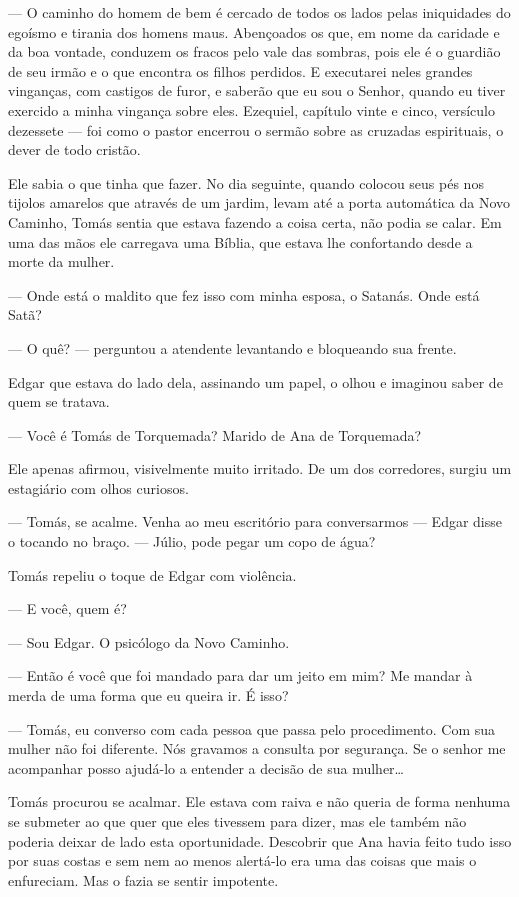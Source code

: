 --- O caminho do homem de bem é cercado de todos os lados pelas iniquidades do egoísmo e tirania dos homens maus. Abençoados os que, em nome da caridade e da boa vontade, conduzem os fracos pelo vale das sombras, pois ele é o guardião de seu irmão e o que encontra os filhos perdidos. E executarei neles grandes vinganças, com castigos de furor, e saberão que eu sou o Senhor, quando eu tiver exercido a minha vingança sobre eles. Ezequiel, capítulo vinte e cinco, versículo dezessete --- foi como o pastor encerrou o sermão sobre as cruzadas espirituais, o dever de todo cristão.

Ele sabia o que tinha que fazer. No dia seguinte, quando colocou seus pés nos tijolos amarelos que\mudanca{,} através de um jardim, levam até a porta automática da Novo Caminho, Tomás sentia que estava fazendo a coisa certa, não podia se calar. Em uma das mãos ele carregava uma Bíblia, que estava lhe confortando desde a morte da mulher.

--- Onde está o maldito que fez isso com minha esposa, o Satanás. Onde está Satã?

--- O quê? --- perguntou a atendente\mudanca{,} levantando e bloqueando sua frente.

Edgar que estava do lado dela, assinando um papel, o olhou e imaginou saber de quem se tratava.

--- Você é Tomás de Torquemada? Marido de Ana de Torquemada?

Ele apenas afirmou, visivelmente muito irritado. De um dos corredores, surgiu um estagiário com olhos curiosos.

--- Tomás, se acalme. Venha ao meu escritório para conversarmos --- Edgar disse o tocando no braço. --- Júlio, pode pegar um copo de água?

Tomás repeliu o toque de Edgar com violência.

--- E você, quem é?

--- Sou Edgar. O psicólogo da Novo Caminho.

--- Então é você que foi mandado para dar um jeito em mim? Me mandar à merda de uma forma que eu queira ir. É isso?

--- Tomás, eu converso com cada pessoa que passa pelo procedimento. Com sua mulher não foi diferente. Nós gravamos a consulta por segurança. Se o senhor me acompanhar posso ajudá-lo a entender a decisão de sua mulher\ldots

Tomás procurou se acalmar. Ele estava com raiva e não queria de forma nenhuma se submeter ao que quer que eles tivessem para dizer, mas ele também não poderia deixar de lado esta oportunidade. Descobrir que Ana havia feito tudo isso por suas costas e sem nem ao menos alertá-lo era uma das coisas que mais o enfureciam. Mas o fazia se sentir impotente.

